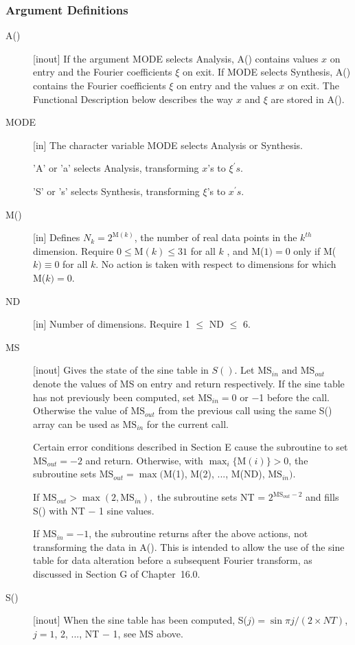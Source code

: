 \documentclass[twoside]{MATH77}
\begin{document}
\subsubsection{Argument Definitions}

\begin{description}
\item[A()]  [inout] If the argument MODE selects Analysis, A() contains
values $x$ on entry and the Fourier coefficients $\xi $ on exit. If MODE
selects Synthesis, A() contains the Fourier coefficients $\xi $ on entry and
the values $x$ on exit. The Functional Description below describes the way $x
$ and $\xi $ are stored in A().

\item[MODE]  [in] The character variable MODE selects Analysis or Synthesis.

'A' or 'a' selects Analysis, transforming $x$'s to $\xi ^{\prime }s.
$

'S' or 's' selects Synthesis, transforming $\xi $'s to $x^{\prime
}s.$

\item[M()]  [in] Defines $N_k=2^{\text{M}(k)}$, the number of real data points in
the $k^{th}$ dimension. Require $0\leq \text{M}(k)\leq 31$ for all $k$%
, and M($1)=0$ only if M($k)\equiv 0$ for all $k$. No action is taken with
respect to dimensions for which M($k)=0.$

\item[ND]  [in] Number of dimensions. Require 1 $\leq $ ND $\leq $ 6.

\item[MS]  [inout] Gives the state of the sine table in $S()$.  Let
$\text{MS}_{in}\text{ and MS}_{out}$ denote the values of MS on entry
and return respectively. If the sine table has not previously been
computed, set $\text{MS}_{in} = 0$ or $-$1 before the call. Otherwise
the value of $\text{MS}_{out}$ from the previous call using the same
S() array can be used as $\text{MS}_{in}$ for the current call.

Certain error conditions described in Section E cause the subroutine
to set $\text{MS}_{out} = -2$ and return.  Otherwise, with $\max _i
\{\text{M}(i)\} > 0$, the subroutine sets $\text{MS}_{out} = \max
($M(1), M(2), ..., M(ND), $\text{MS}_{in}).$

If $\text{MS}_{out} > \max (2, \text{MS}_{in}),$ the subroutine sets
NT = $2^{\text{MS}_{out}-2}$ and fills S() with NT $-$ 1 sine values.

If $\text{MS}_{in}=-1$, the subroutine returns after the above
actions, not transforming the data in A().  This is intended to allow
the use of the sine table for data alteration before a subsequent Fourier
transform, as discussed in Section G of Chapter~16.0.

\item[S()]  [inout] When the sine table has been computed, S($j)=\sin \pi
j/(2\times {\textstyle NT})$, $j=1$, 2, ..., NT $-$ 1, see MS above.
\end{description}
\end{document}
